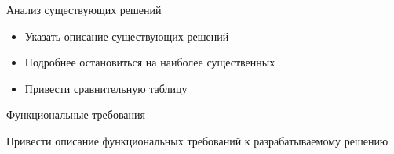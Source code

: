 \documentclass{../cls/fefu_presentation}
\begin{document}
    \begin{frame}{Анализ существующих решений}
        \begin{block}{}
            \begin{itemize}
                \item Указать описание существующих решений
                \item Подробнее остановиться на наиболее существенных
                \item Привести сравнительную таблицу
            \end{itemize}
        \end{block}

        \begin{fefucomparisontable}

            \convenient[$\pm$]
            \free
            \grade

            \grade

            \convenient
            \free

        \end{fefucomparisontable}
    \end{frame}

    \note{}

    \begin{frame}{Функциональные требования}
        \begin{block}{}
            Привести описание функциональных требований к разрабатываемому решению
        \end{block}
    \end{frame}

    \note{}
\end{document}
